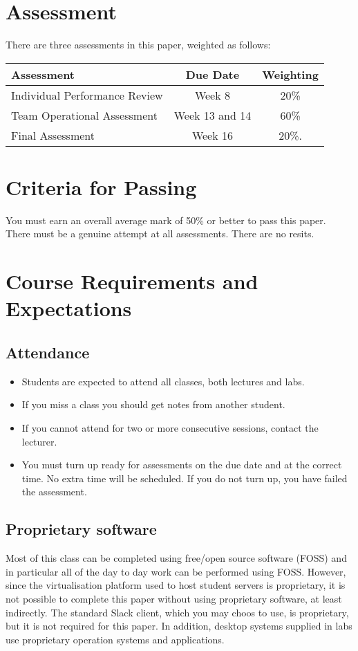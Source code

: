 \documentclass{article}
\begin{document}
\section*{Assessment}
There are three assessments in this paper, weighted as follows:


\begin{tabular}{|l|c|c|}
\hline
Assessment                    & Due Date       & Weighting \\ \hline
Individual Performance Review & Week 8         & 20\% \\ \hline
Team Operational Assessment   & Week 13 and 14 & 60\% \\ \hline
Final Assessment              & Week 16        & 20\%. \\ \hline
\end{tabular}


\section*{Criteria for Passing}
You must earn an overall average mark of 50\% or better to pass this paper. There must be a genuine attempt at all assessments. There are no resits.

\section*{Course Requirements and Expectations}
\subsection*{Attendance}
\begin{itemize}
 \item Students are expected to attend all classes, both lectures and labs.
 \item If you miss a class you should get notes from another student.
 \item If you cannot attend for two or more consecutive sessions, contact the lecturer.
 \item You must turn up ready for assessments on the due date and at the correct time. No 
       extra time will be scheduled. If you do not turn up, you have failed the assessment.
\end{itemize}

\subsection*{Proprietary software}
Most of this class can be completed using free/open source software (FOSS) and in particular all of the day to day work can be performed using FOSS. However, since the virtualisation platform used to host student servers is proprietary, it is not possible to complete this paper without using proprietary software, at least indirectly. The standard Slack client, which you may choos to use, is proprietary, but it is not required for this paper. In addition, desktop systems supplied in labs use proprietary operation systems and applications.
\end{document}
